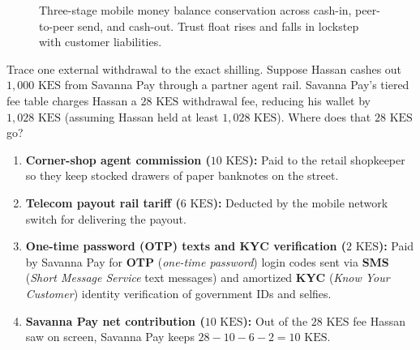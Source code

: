 \begin{figure}[htbp]
\caption{Three-stage mobile money balance conservation across cash-in, peer-to-peer send, and cash-out. Trust float rises and falls in lockstep with customer liabilities.}
\label{ch07:fig-wallet-lifecycle}
\end{figure}

Trace one external withdrawal to the exact shilling. Suppose Hassan cashes out $1{,}000\text{ KES}$ from Savanna Pay through a partner agent rail. Savanna Pay's tiered fee table charges Hassan a $28\text{ KES}$ withdrawal fee, reducing his wallet by $1{,}028\text{ KES}$ (assuming Hassan held at least $1{,}028\text{ KES}$). Where does that $28\text{ KES}$ go?
\begin{enumerate}
  \item \textbf{Corner-shop agent commission ($10\text{ KES}$):} Paid to the retail shopkeeper so they keep stocked drawers of paper banknotes on the street.
  \item \textbf{Telecom payout rail tariff ($6\text{ KES}$):} Deducted by the mobile network switch for delivering the payout.
  \item \textbf{One-time password (OTP) texts and KYC verification ($2\text{ KES}$):} Paid by Savanna Pay for \textbf{OTP} (\emph{one-time password}) login codes sent via \textbf{SMS} (\emph{Short Message Service} text messages) and amortized \textbf{KYC} (\emph{Know Your Customer}) identity verification of government IDs and selfies.
  \item \textbf{Savanna Pay net contribution ($10\text{ KES}$):} Out of the $28\text{ KES}$ fee Hassan saw on screen, Savanna Pay keeps $28 - 10 - 6 - 2 = 10\text{ KES}$.
\end{enumerate}


